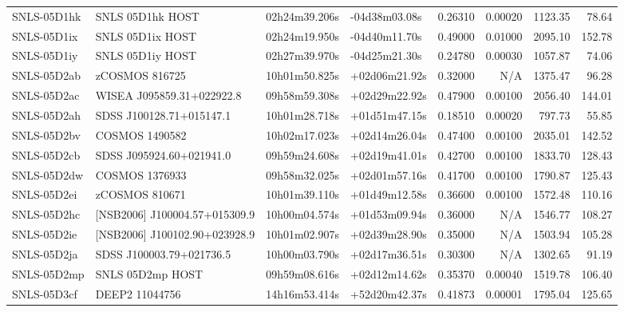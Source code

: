 \begin{longtable}{llllrrrr}
SNLS-05D1hk      &                SNLS 05D1hk HOST &   02h24m39.206s &   -04d38m03.08s &  0.26310 &  0.00020 &  1123.35 &       78.64 \\
SNLS-05D1ix      &                SNLS 05D1ix HOST &   02h24m19.950s &   -04d40m11.70s &  0.49000 &  0.01000 &  2095.10 &      152.78 \\
SNLS-05D1iy      &                SNLS 05D1iy HOST &   02h27m39.970s &   -04d25m21.30s &  0.24780 &  0.00030 &  1057.87 &       74.06 \\
SNLS-05D2ab      &                  zCOSMOS 816725 &   10h01m50.825s &   +02d06m21.92s &  0.32000 &      N/A &  1375.47 &       96.28 \\
SNLS-05D2ac      &       WISEA J095859.31+022922.8 &   09h58m59.308s &   +02d29m22.92s &  0.47900 &  0.00100 &  2056.40 &      144.01 \\
SNLS-05D2ah      &        SDSS J100128.71+015147.1 &   10h01m28.718s &   +01d51m47.15s &  0.18510 &  0.00020 &   797.73 &       55.85 \\
SNLS-05D2bv      &                  COSMOS 1490582 &   10h02m17.023s &   +02d14m26.04s &  0.47400 &  0.00100 &  2035.01 &      142.52 \\
SNLS-05D2cb      &        SDSS J095924.60+021941.0 &   09h59m24.608s &   +02d19m41.01s &  0.42700 &  0.00100 &  1833.70 &      128.43 \\
SNLS-05D2dw      &                  COSMOS 1376933 &   09h58m32.025s &   +02d01m57.16s &  0.41700 &  0.00100 &  1790.87 &      125.43 \\
SNLS-05D2ei      &                  zCOSMOS 810671 &   10h01m39.110s &   +01d49m12.58s &  0.36600 &  0.00100 &  1572.48 &      110.16 \\
SNLS-05D2hc      &  [NSB2006] J100004.57+015309.9  &   10h00m04.574s &   +01d53m09.94s &  0.36000 &      N/A &  1546.77 &      108.27 \\
SNLS-05D2ie      &  [NSB2006] J100102.90+023928.9  &   10h01m02.907s &   +02d39m28.90s &  0.35000 &      N/A &  1503.94 &      105.28 \\
SNLS-05D2ja      &        SDSS J100003.79+021736.5 &   10h00m03.790s &   +02d17m36.51s &  0.30300 &      N/A &  1302.65 &       91.19 \\
SNLS-05D2mp      &                SNLS 05D2mp HOST &   09h59m08.616s &   +02d12m14.62s &  0.35370 &  0.00040 &  1519.78 &      106.40 \\
SNLS-05D3cf      &                  DEEP2 11044756 &   14h16m53.414s &   +52d20m42.37s &  0.41873 &  0.00001 &  1795.04 &      125.65 \\

\end{longtable}
